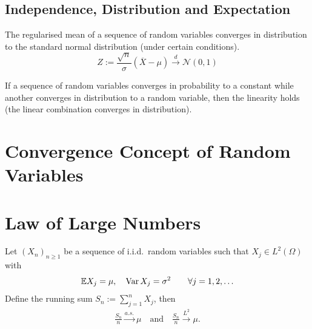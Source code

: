 \subsection{Independence, Distribution and Expectation}
\begin{review}
The regularised mean of a sequence of random variables converges in distribution to the standard normal distribution (under certain conditions).
\begin{equation*}
    Z := \frac{\sqrt{n}}{\sigma}(\overline{X} - \mu) \overset{d}{\longrightarrow} \mathcal{N}(0, 1)
\end{equation*}
\end{review}

\begin{review}
If a sequence of random variables converges in probability to a constant while another converges in distribution to a random variable, then the linearity holds (the linear combination converges in distribution).
\end{review}

\begin{review}
\end{review}

\section{Convergence Concept of Random Variables}
\begin{definition}
\end{definition}

\begin{definition}
\end{definition}

\begin{definition}[Convergence in $L^p$]
\end{definition}



\section{Law of Large Numbers}
\begin{theorem}
	Let $(X_n)_{n \ge 1}$ be a sequence of i.i.d.\ random variables such that $X_j \in L^2(\Omega)$ with
	\begin{align*}
		\mathbb{E}X_j = \mu, \quad \operatorname{Var} X_j = \sigma^2 \qquad \forall j = 1, 2, \dots
	\end{align*}
	Define the running sum $S_n := \sum_{j = 1}^n X_j$, then
	\begin{align*}
		\frac{S_n}{n} \overset{a.s.}{\longrightarrow} \mu \quad \text{and} \quad \frac{S_n}{n} \overset{L^2}{\longrightarrow} \mu.
	\end{align*}
\end{theorem}


